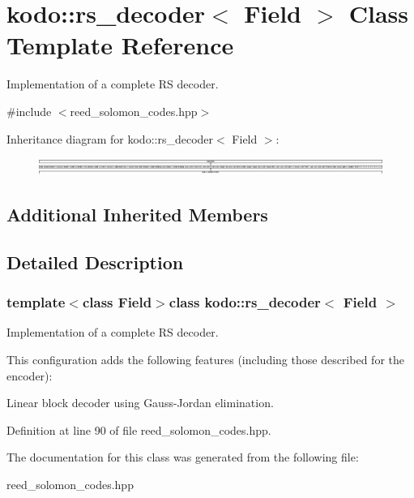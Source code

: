 \hypertarget{classkodo_1_1rs__decoder}{\section{kodo\-:\-:rs\-\_\-decoder$<$ Field $>$ Class Template Reference}
\label{classkodo_1_1rs__decoder}
}


Implementation of a complete R\-S decoder.  




{\ttfamily \#include $<$reed\-\_\-solomon\-\_\-codes.\-hpp$>$}

Inheritance diagram for kodo\-:\-:rs\-\_\-decoder$<$ Field $>$\-:\begin{figure}[H]
\begin{center}
\leavevmode
\includegraphics[height=0.555188cm]{classkodo_1_1rs__decoder}
\end{center}
\end{figure}
\subsection*{Additional Inherited Members}


\subsection{Detailed Description}
\subsubsection*{template$<$class Field$>$class kodo\-::rs\-\_\-decoder$<$ Field $>$}

Implementation of a complete R\-S decoder. 

This configuration adds the following features (including those described for the encoder)\-:
\begin{DoxyItemize}
\item Linear block decoder using Gauss-\/\-Jordan elimination. 
\end{DoxyItemize}

Definition at line 90 of file reed\-\_\-solomon\-\_\-codes.\-hpp.



The documentation for this class was generated from the following file\-:\begin{DoxyCompactItemize}
\item 
reed\-\_\-solomon\-\_\-codes.\-hpp\end{DoxyCompactItemize}
